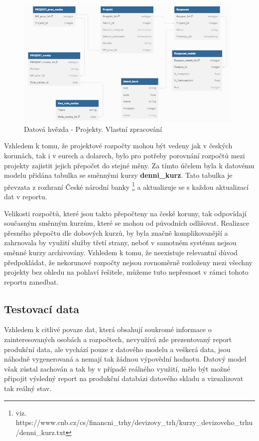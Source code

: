 \documentclass[
  digital,     %
  twoside,     %
  lof,         %
  lot,         %
]{fithesis4}
\begin{document}
    \begin{figure}[t]
        \begin{center}
            \includegraphics[width=11cm]{img/projects_sch.png}
        \end{center}
        \caption{Datová hvězda - Projekty. Vlastní zpracování}
        \label{fig:projects_sch}
    \end{figure} 

    
Vzhledem k tomu, že projektové rozpočty mohou být vedeny jak v českých korunách, tak i v eurech a dolarech, bylo pro potřeby porovnání rozpočtů mezi projekty zajistit jejich přepočet do stejné měny. Za tímto účelem byla k datovému modelu přidána tabulka se směnnými kurzy \textbf{denni\_kurz}. Tato tabulka je převzata z rozhraní České národní banky \footnote{viz. https://www.cnb.cz/cs/financni\_trhy/devizovy\_trh/kurzy\_devizoveho\_trhu/denni\_kurz.txt} a aktualizuje se s každou aktualizací dat v reportu. 

Velikosti rozpočtů, které jsou takto přepočteny na české koruny, tak odpovídají současným směnným kurzům, které se mohou od původních odlišovat. Realizace přesného přepočtu dle dobových kurzů, by byla značně komplikovanější a zahrnovala by využití služby třetí strany, neboť v samotném systému nejsou směnné kurzy archivovány. Vzhledem k tomu, že neexistuje relevantní důvod předpokládat, že nekorunové rozpočty nejsou rovnoměrně rozloženy mezi všechny projekty bez ohledu na pohlaví řešitele, můžeme tuto nepřesnost v rámci tohoto reportu zanedbat.

\subsection{Testovací data}
Vzhledem k citlivé povaze dat, která obsahují soukromé informace o zainteresovaných osobách a rozpočtech, nevyužívá zde prezentovaný report produkční data, ale vychází pouze z datového modelu a veškerá data, jsou náhodně vygenerovaná a nemají tak žádnou výpovědní hodnotu.  Datový model však zůstal zachován a tak by v případě reálného využití, mělo být možné připojit výsledný report na produkční databázi datového skladu a vizualizovat tak reálný stav. 
\end{document}

